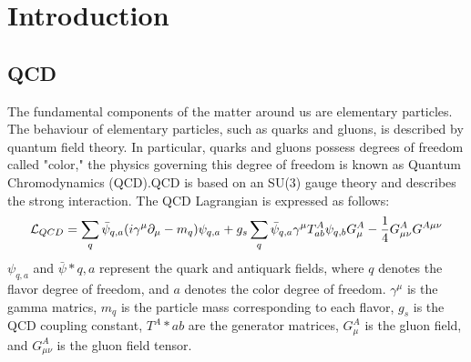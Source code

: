
\section{Introduction}
    \subsection{QCD}
    \label{Intro:QCD}
        The fundamental components of the matter around us are elementary particles. The behaviour of elementary particles, such as quarks and gluons, is described by quantum field theory. In particular, quarks and gluons possess degrees of freedom called "color," the physics governing this degree of freedom is known as Quantum Chromodynamics (QCD).\@ QCD is based on an SU(3) gauge theory and describes the strong interaction. The QCD Lagrangian is expressed as follows:
        \begin{eqnarray}
            \label{QCDlagrangian}
            \mathcal{L}_{QCD}=\sum_q \bar{\psi}_{q,a}\qty(i\gamma^\mu\partial_\mu-m_q)\psi_{q,a}+g_s \sum_q \bar{\psi}_{q,a}\gamma^\mu T^A_{ab}\psi_{q,b}G^A_\mu-\frac{1}{4}G^A_{\mu\nu}G^{A\mu\nu}
        \end{eqnarray}
        $\psi_{q,a}$ and $\bar{\psi}*{q,a}$ represent the quark and antiquark fields, where $q$ denotes the flavor degree of freedom, and $a$ denotes the color degree of freedom. $\gamma^\mu$ is the gamma matrics, $m_q$ is the particle mass corresponding to each flavor, $g_s$ is the QCD coupling constant, $T^A*{ab}$ are the generator matrices, $G^A_\mu$ is the gluon field, and $G^A_{\mu\nu}$ is the gluon field tensor.

